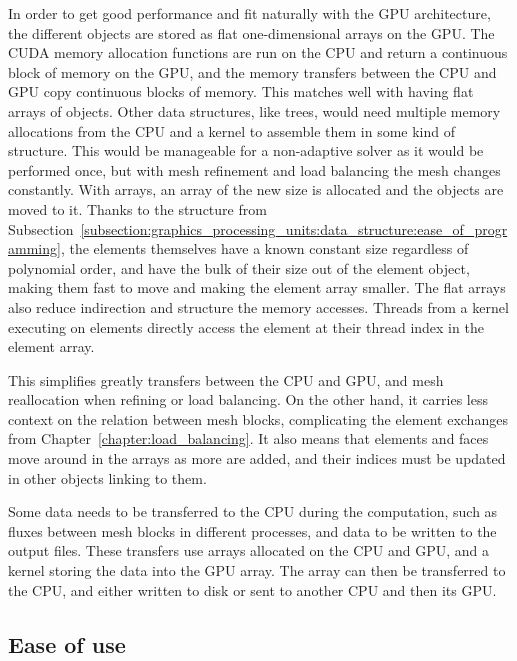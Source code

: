 In order to get good performance and fit naturally with the GPU architecture, the different objects
are stored as flat one-dimensional arrays on the GPU. The CUDA memory allocation functions are run
on the CPU and return a continuous block of memory on the GPU, and the memory transfers between the
CPU and GPU copy continuous blocks of memory. This matches well with having flat arrays of objects.
Other data structures, like trees, would need multiple memory allocations from the CPU and a kernel
to assemble them in some kind of structure. This would be manageable for a non-adaptive solver as it
would be performed once, but with mesh refinement and load balancing the mesh changes constantly.
With arrays, an array of the new size is allocated and the objects are moved to it. Thanks to the
structure from
Subsection~\ref{subsection:graphics_processing_units:data_structure:ease_of_programming}, the
elements themselves have a known constant size regardless of polynomial order, and have the bulk of
their size out of the element object, making them fast to move and making the element array smaller.
The flat arrays also reduce indirection and structure the memory accesses. Threads from a kernel
executing on elements directly access the element at their thread index in the element array.

This simplifies greatly transfers between the CPU and GPU, and mesh reallocation when refining or
load balancing. On the other hand, it carries less context on the relation between mesh blocks,
complicating the element exchanges from Chapter~\ref{chapter:load_balancing}. It also means that
elements and faces move around in the arrays as more are added, and their indices must be updated in
other objects linking to them. 

Some data needs to be transferred to the CPU during the computation, such as fluxes between mesh
blocks in different processes, and data to be written to the output files. These transfers use
arrays allocated on the CPU and GPU, and a kernel storing the data into the GPU array. The array can
then be transferred to the CPU, and either written to disk or sent to another CPU and then its GPU.

\subsection{Ease of use} \label{subsection:graphics_processing_units:data_structure:ease_of_use}


